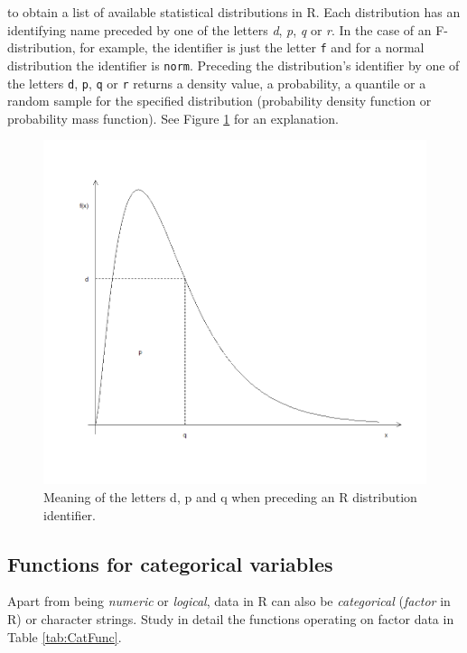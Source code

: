 \documentclass[
]{book}
\begin{document}
to obtain a list of available statistical distributions in R. Each distribution has an identifying name preceded by one of the letters \emph{{d}}, \emph{{p}}, \emph{{q}} or \emph{{r}}. In the case of an F-distribution, for example, the identifier is just the letter \texttt{f} and for a normal distribution the identifier is \texttt{norm}. Preceding the distribution's identifier by one of the letters \texttt{d}, \texttt{p}, \texttt{q} or \texttt{r} returns a density value, a probability, a quantile or a random sample for the specified distribution (probability density function or probability mass function). See Figure \ref{fig:Fdist} for an explanation.

\begin{figure}
\includegraphics[width=1\linewidth]{pics/F-distribution} \caption{Meaning of the letters d, p and q when preceding an R distribution identifier.}\label{fig:Fdist}
\end{figure}

\subsection{Functions for categorical variables}\label{areagrp}

Apart from being \emph{{numeric}} or \emph{{logical}}, data in R can also be \emph{{categorical}} (\emph{{factor}} in R) or character strings. Study in detail the functions operating on factor data in Table \ref{tab:CatFunc}.
\end{document}
